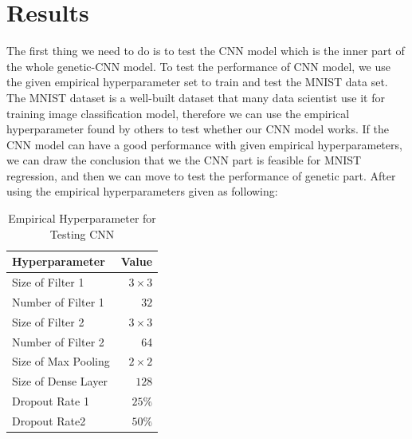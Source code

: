 \documentclass[12pt]{article}
\begin{document}
\section{Results}
The first thing we need to do is to test the CNN model which is the inner part of the whole genetic-CNN model. To test the performance of CNN model, we use the given empirical hyperparameter set to train and test the MNIST data set. The MNIST dataset is a well-built dataset that many data scientist use it for training image classification model, therefore we can use the empirical hyperparameter found by others to test whether our CNN model works. If the CNN model can have a good performance with given empirical hyperparameters, we can draw the conclusion that we the CNN part is feasible for MNIST regression, and then we can move to test the performance of genetic part. After using the empirical hyperparameters given as following:\\
\begin{table}
\caption{Empirical Hyperparameter for Testing CNN}
\centering
\begin{tabular}{l r}
\hline\hline 
Hyperparameter & Value \\ [0.5ex]
\hline
Size of Filter 1 & $3 \times 3$ \\
Number of Filter 1 & $32 $\\
Size of Filter 2 & $3 \times 3$ \\
Number of Filter 2 & 64 \\
Size of Max Pooling & $2 \times 2$ \\
Size of Dense Layer & $128$ \\
Dropout Rate 1 & $25\%$ \\
Dropout Rate2 & $50\%$ \\
\hline
\end{tabular}
\label{table:empirical}
\end{table}
\end{document}
